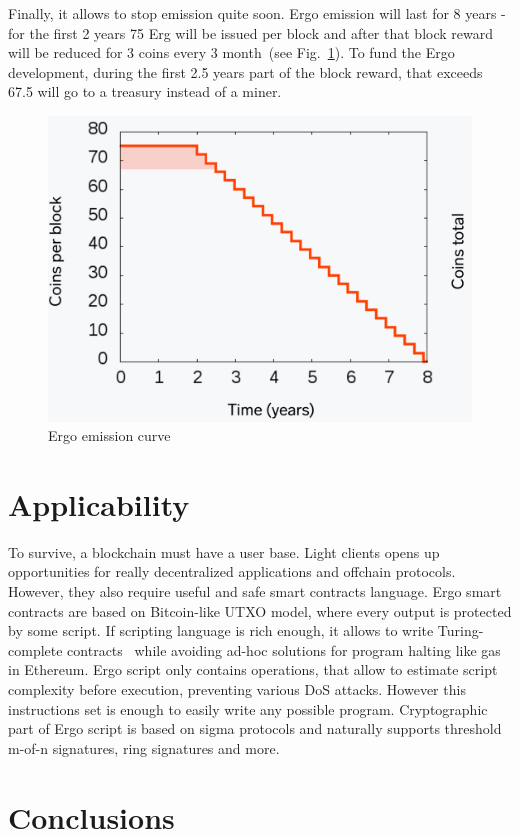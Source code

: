 \documentclass[]{article}
\begin{document}
    Finally, it allows to stop emission quite soon.
    Ergo emission will last for 8 years - for the first 2 years 75 Erg will be issued per block
    and after that block reward will be reduced for 3 coins every 3 month~(see Fig.~\ref{fig:emission}).
    To fund the Ergo development, during the first 2.5 years part of the block reward, that
    exceeds 67.5 will go to a treasury instead of a miner.

    \begin{figure}[h]
        \centering
        \includegraphics[width=\textwidth]{emission.png}
        \caption{Ergo emission curve
        \label{fig:emission} }
    \end{figure}


    \section{Applicability}

    To survive, a blockchain must have a user base.
    Light clients opens up opportunities for really decentralized applications and offchain protocols.
    However, they also require useful and safe smart contracts language.
    Ergo smart contracts are based on Bitcoin-like UTXO model, where every output is protected by some script.
    If scripting language is rich enough, it allows to write Turing-complete contracts~\cite{chepurnoy2018self}
    while avoiding ad-hoc solutions for program halting like gas in Ethereum.
    Ergo script only contains operations, that allow to estimate script complexity before execution,
    preventing various DoS attacks.
    However this instructions set is enough to easily write any possible program.
    Cryptographic part of Ergo script is based on sigma protocols and naturally supports
    threshold m-of-n signatures, ring signatures and more.


    \section{Conclusions}


    
\end{document}
